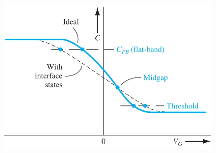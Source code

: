 \documentclass{beamer}
\begin{document}
\begin{frame}
\begin{minipage}{\linewidth}
\begin{minipage}{0.45\linewidth}
\begin{figure}[H]
                    \centering
                    \includegraphics[width=0.9\linewidth]{Surface-states.jpg}
                    \label{fig:Surface-states.jpg}
                \end{figure}
            \end{minipage}
        \end{minipage}
    \end{frame}
\end{document}
